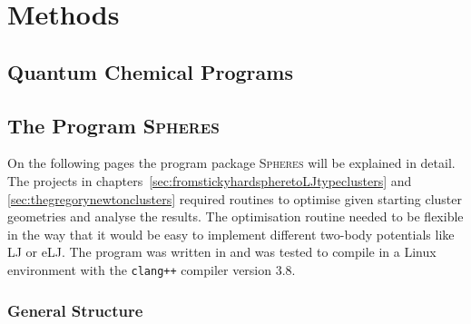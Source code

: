 
\part{Methods}
\label{sec:methods}

\chapter{Quantum Chemical Programs}
\label{sec:quantumchemicalprograms}

\chapter{The Program \textsc{Spheres}}
\label{sec:theprogramspheres}

On the following pages the program package \textsc{Spheres} will be explained
in detail. The projects in
chapters~\ref{sec:fromstickyhardspheretoLJtypeclusters} and
\ref{sec:thegregorynewtonclusters} required routines to optimise given starting
cluster geometries and analyse the results. The optimisation routine needed to
be flexible in the way that it would be easy to implement different two-body
potentials like \ac{LJ} or \ac{eLJ}. The program was written in \Cpp
and was tested to compile in a Linux environment with the \texttt{clang++}
compiler version 3.8.

\section{General Structure}
\label{sec:generalstructure}

